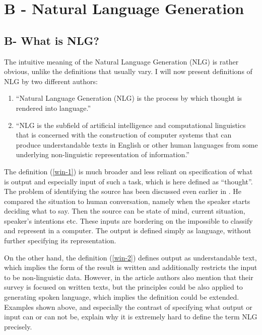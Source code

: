\chapter{B - Natural Language Generation}\label{chap:nlg}

\section{B- What is NLG?}
The intuitive meaning of the Natural Language Generation (NLG) is rather obvious, unlike the definitions that usually vary. I will now present definitions of NLG by two different authors:
\begin{enumerate}
	\item “Natural Language Generation (NLG) is the process by which thought is rendered into language.”\label{win-1}\cite{mcdonald2010natural}
	\item “NLG is the subfield of artificial intelligence and computational linguistics that is concerned with the construction of computer systems that can produce understandable texts in English or other human languages from some underlying non-linguistic representation of information.”\label{win-2}\cite{reiter1997building}
\end{enumerate}

The definition (\ref{win-1}) is much broader and less reliant on specification of what is output and especially input of such a task, which is here defined as “thought”. The problem of identifying the source has been discussed even earlier in \cite{mcdonald1993issues}. He compared the situation to human conversation, namely when the speaker starts deciding what to say. Then the source can be state of mind, current situation, speaker’s intentions etc. These inputs are bordering on the impossible to classify and represent in a computer. The output is defined simply as language, without further specifying its representation. 

On the other hand, the definition (\ref{win-2}) defines output as understandable text, which implies the form of the result is written and additionally restricts the input to be non-linguistic data. However, in the article authors also mention that their survey is focused on written texts, but the principles could be also applied to generating spoken language, which implies the definition could be extended. Examples shown above, and especially the contrast of specifying what output or input can or can not be, explain why it is extremely hard to define the term NLG precisely.
 
